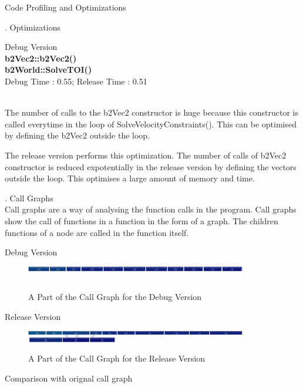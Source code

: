 \documentclass[a4paper,11pt]{resume}
\begin{document}
\begin{rSection}{{\heading Code Profiling and Optimizations}}
\begin{rSubsection}{{. Optimizations}}{}{}{}
\begin{rSubsection}{{ Debug Version}}{}{}{}
\\
\textbf{b2Vec2::b2Vec2()} \\ 
\textbf{b2World::SolveTOI()} \\
Debug Time : 0.55; Release Time : 0.51 \\ \\
\item The number of calls to the b2Vec2 constructor is huge because this constructor is called everytime in the loop of SolveVelocityConstraints(). This can be optimised by defining the b2Vec2 outside the loop.
\item The release version performs this optimization. The number of calls of b2Vec2 constructor is reduced expotentially in the release version by defining the vectors outside the loop. This optimises a large amount of memory and time.
\end{rSubsection}
\end{rSubsection}
\newpage
\begin{rSubsection}{{. Call Graphs}}{}{}{} 
\\
Call graphs are a way of analysing the function calls in the program. Call graphs show the call of functions in a function in the form of a graph. The children functions of a node are called in the function itself. \\
\begin{rSubsection}{{\heading Debug Version}}{}{}{}
\begin{figure}[h]
\centering
\includegraphics[width=0.86\textwidth]{analysisDebug}
\label{fig:init}
\caption{A Part of the Call Graph for the Debug Version}
\end{figure}
\end{rSubsection}
\begin{rSubsection}{{\heading Release Version}}{}{}{}
\begin{figure}[h]
\centering
\includegraphics[width=0.86\textwidth]{releaseanalysis}
\label{fig:init}
\caption{A Part of the Call Graph for the Release Version}
\end{figure}
\end{rSubsection}
\end{rSubsection}
\begin{rSubsection}{{\heading Comparison with orignal call graph}}{}{}{}

\end{rSubsection}
\end{rSection}
\end{document}
